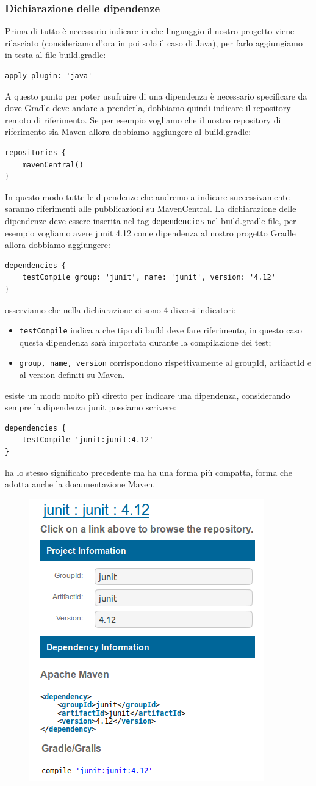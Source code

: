 \subsubsection{Dichiarazione delle dipendenze}
Prima di tutto è necessario indicare in che linguaggio il nostro progetto viene rilasciato (consideriamo d'ora in poi solo il caso di Java), per farlo aggiungiamo in testa al file build.gradle:
\begin{verbatim}
apply plugin: 'java' \end{verbatim}
A questo punto per poter usufruire di una dipendenza è necessario specificare da dove Gradle deve andare a prenderla, dobbiamo quindi indicare il repository remoto di riferimento. Se per esempio vogliamo che il nostro repository di riferimento sia Maven allora dobbiamo aggiungere al build.gradle:
\begin{verbatim}
repositories {
    mavenCentral()
} \end{verbatim}
In questo modo tutte le dipendenze che andremo a indicare successivamente saranno riferimenti alle pubblicazioni su MavenCentral. La dichiarazione delle dipendenze deve essere inserita nel tag \texttt{dependencies} nel build.gradle file, per esempio vogliamo avere junit 4.12 come dipendenza al nostro progetto Gradle allora dobbiamo aggiungere:
\begin{verbatim}
dependencies {
    testCompile group: 'junit', name: 'junit', version: '4.12' 
} \end{verbatim}
osserviamo che nella dichiarazione ci sono 4 diversi indicatori:
\begin{itemize}
    \item \texttt{testCompile} indica a che tipo di build deve fare riferimento, in questo caso questa dipendenza sarà importata durante la compilazione dei test;
    \item \texttt{group, name, version} corrispondono rispettivamente al groupId, artifactId e al version definiti su Maven.
\end{itemize}
esiste un modo molto più diretto per indicare una dipendenza, considerando sempre la dipendenza junit possiamo scrivere:
\begin{verbatim}
dependencies {
    testCompile 'junit:junit:4.12'
} \end{verbatim}
ha lo stesso significato precedente ma ha una forma più compatta, forma che adotta anche la documentazione Maven.
\begin{figure}[H]
\centering
\includegraphics[width=0.4\linewidth]{HowToUse/third/gradleInMavenRepo.png}
\end{figure} 

